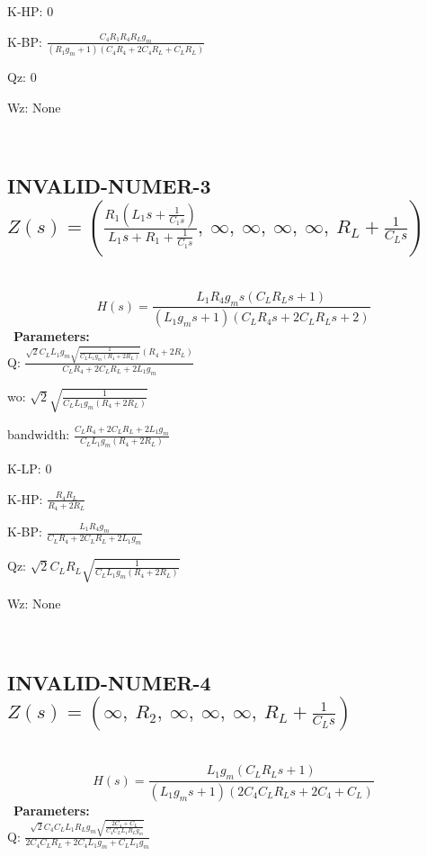 \documentclass{article}
\begin{document}
K-HP: $0$\ 

K-BP: $\frac{C_{4} R_{1} R_{4} R_{L} g_{m}}{\left(R_{1} g_{m} + 1\right) \left(C_{4} R_{4} + 2 C_{4} R_{L} + C_{L} R_{L}\right)}$\ 

Qz: $0$\ 

Wz: $\text{None}$\ 

\ 

\subsection{INVALID-NUMER-3 $Z(s) = \left( \frac{R_{1} \left(L_{1} s + \frac{1}{C_{1} s}\right)}{L_{1} s + R_{1} + \frac{1}{C_{1} s}}, \  \infty, \  \infty, \  \infty, \  \infty, \  R_{L} + \frac{1}{C_{L} s}\right)$ } \ 
\textbf{\[H(s) = \frac{L_{1} R_{4} g_{m} s \left(C_{L} R_{L} s + 1\right)}{\left(L_{1} g_{m} s + 1\right) \left(C_{L} R_{4} s + 2 C_{L} R_{L} s + 2\right)}\] } \ 
\textbf{Parameters:}\\ 

Q: $\frac{\sqrt{2} C_{L} L_{1} g_{m} \sqrt{\frac{1}{C_{L} L_{1} g_{m} \left(R_{4} + 2 R_{L}\right)}} \left(R_{4} + 2 R_{L}\right)}{C_{L} R_{4} + 2 C_{L} R_{L} + 2 L_{1} g_{m}}$\ 

wo: $\sqrt{2} \sqrt{\frac{1}{C_{L} L_{1} g_{m} \left(R_{4} + 2 R_{L}\right)}}$\ 

bandwidth: $\frac{C_{L} R_{4} + 2 C_{L} R_{L} + 2 L_{1} g_{m}}{C_{L} L_{1} g_{m} \left(R_{4} + 2 R_{L}\right)}$\ 

K-LP: $0$\ 

K-HP: $\frac{R_{4} R_{L}}{R_{4} + 2 R_{L}}$\ 

K-BP: $\frac{L_{1} R_{4} g_{m}}{C_{L} R_{4} + 2 C_{L} R_{L} + 2 L_{1} g_{m}}$\ 

Qz: $\sqrt{2} C_{L} R_{L} \sqrt{\frac{1}{C_{L} L_{1} g_{m} \left(R_{4} + 2 R_{L}\right)}}$\ 

Wz: $\text{None}$\ 

\ 

\subsection{INVALID-NUMER-4 $Z(s) = \left( \infty, \  R_{2}, \  \infty, \  \infty, \  \infty, \  R_{L} + \frac{1}{C_{L} s}\right)$ } \ 
\textbf{\[H(s) = \frac{L_{1} g_{m} \left(C_{L} R_{L} s + 1\right)}{\left(L_{1} g_{m} s + 1\right) \left(2 C_{4} C_{L} R_{L} s + 2 C_{4} + C_{L}\right)}\] } \ 
\textbf{Parameters:}\\ 

Q: $\frac{\sqrt{2} C_{4} C_{L} L_{1} R_{L} g_{m} \sqrt{\frac{2 C_{4} + C_{L}}{C_{4} C_{L} L_{1} R_{L} g_{m}}}}{2 C_{4} C_{L} R_{L} + 2 C_{4} L_{1} g_{m} + C_{L} L_{1} g_{m}}$\ 
\end{document}
